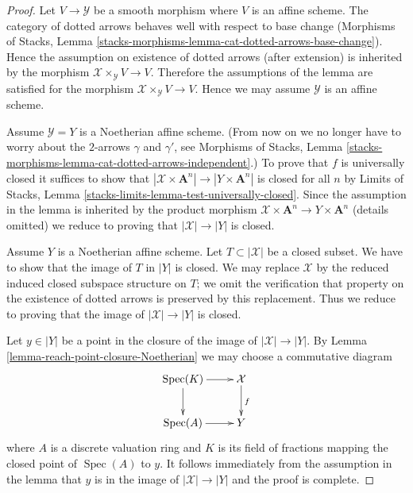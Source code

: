 \documentclass[10pt,a4paper]{amsart}
\theoremstyle{plain}
\theoremstyle{definition}
\theoremstyle{remark}
\numberwithin{equation}{subsection}
\def\Spec{\mathop{\mathrm{Spec}}}
\begin{document}
\begin{proof}
Let $V \to \mathcal{Y}$ be a smooth morphism where $V$ is an affine scheme.
The category of dotted arrows behaves well with respect to base change
(Morphisms of Stacks, Lemma
\ref{stacks-morphisms-lemma-cat-dotted-arrows-base-change}).
Hence the assumption on existence of dotted arrows (after extension)
is inherited by the morphism $\mathcal{X} \times_\mathcal{Y} V \to V$.
Therefore the assumptions of the lemma are satisfied for the morphism
$\mathcal{X} \times_\mathcal{Y} V \to V$.
Hence we may assume $\mathcal{Y}$ is an affine scheme.

\medskip\noindent
Assume $\mathcal{Y} = Y$ is a Noetherian affine scheme.
(From now on we no longer have to worry about the
$2$-arrows $\gamma$ and $\gamma'$, see Morphisms of Stacks, Lemma
\ref{stacks-morphisms-lemma-cat-dotted-arrows-independent}.)
To prove that $f$ is universally closed it suffices to show that
$|\mathcal{X} \times \mathbf{A}^n| \to |Y \times \mathbf{A}^n|$ is closed
for all $n$ by Limits of Stacks, Lemma
\ref{stacks-limits-lemma-test-universally-closed}. Since the assumption
in the lemma is inherited by the product morphism
$\mathcal{X} \times \mathbf{A}^n \to Y \times \mathbf{A}^n$ (details omitted)
we reduce to proving that $|\mathcal{X}| \to |Y|$ is closed.

\medskip\noindent
Assume $Y$ is a Noetherian affine scheme.
Let $T \subset |\mathcal{X}|$ be a closed subset. We have to show that
the image of $T$ in $|Y|$ is closed. We may replace $\mathcal{X}$
by the reduced induced closed subspace structure on $T$; we
omit the verification that property on the existence of
dotted arrows is preserved by this replacement.
Thus we reduce to proving that the image
of $|\mathcal{X}| \to |Y|$ is closed.

\medskip\noindent
Let $y \in |Y|$ be a point in the closure of the image of
$|\mathcal{X}| \to |Y|$. By Lemma \ref{lemma-reach-point-closure-Noetherian}
we may choose a commutative diagram
$$
\xymatrix{
\Spec(K) \ar[r] \ar[d] & \mathcal{X} \ar[d]^f \\
\Spec(A) \ar[r] & Y
}
$$
where $A$ is a discrete valuation ring and $K$ is its field of fractions
mapping the closed point of $\Spec(A)$ to $y$. It follows immediately
from the assumption in the lemma that $y$ is in the image of
$|\mathcal{X}| \to |Y|$ and the proof is complete.
\end{proof}
\end{document}
